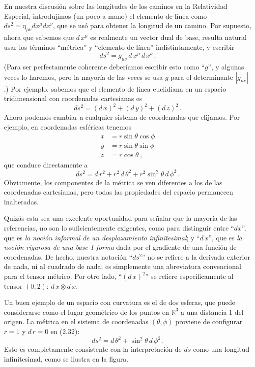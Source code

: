 \documentclass[11pt,b5paper,openany,twoside]{book}
\newcommand{\mn}{{\mu\nu}}
\newcommand{\R}{\mathbb{R}}
\begin{document}
En nuestra discusión sobre las longitudes de los caminos en la Relatividad Especial, introdujimos (un poco a mano) el elemento de línea como $ds^2 = \eta_\mn dx^\mu dx^\nu$, que se usó para obtener la longitud de un camino.
Por supuesto, ahora que sabemos que $ d\,x^\mu$ es realmente un vector dual de base, resulta natural usar los términos ``métrica'' y ``elemento de línea'' indistintamente, y escribir
\begin{equation}
ds^2 = g_\mn \, d\,x^\mu \, d\,x^\nu\,.\label{2.29}
\end{equation}
(Para ser perfectamente coherente deberíamos escribir esto como ``$g$'', y algunas veces lo haremos, pero la mayoría de las veces se usa $g$ para el determinante $|g_\mn|$.)
Por ejemplo, sabemos que el elemento de línea euclidiana en un espacio tridimensional con coordenadas cartesianas es
\begin{equation}
ds^2 = ( d\,x)^2 + ( d\,y)^2 + ( d\,z)^2\,.\label{2.30}
\end{equation}
Ahora podemos cambiar a cualquier sistema de coordenadas que elijamos.
Por ejemplo, en coordenadas esféricas tenemos
\begin{align}
x &=  r\sin\theta \cos\phi\nonumber \\
y &=  r\sin\theta \sin\phi\nonumber \\ z &=  r\cos\theta\ , \label{2.31}
\end{align}
que conduce directamente a
\begin{equation}
ds^2 =  d\,r^2 + r^2 \, d\,\theta^2 + r^2\sin^2\theta\, d\,\phi^2\,.\label{2.32}
\end{equation}
Obviamente, los componentes de la métrica se ven diferentes a los de las coordenadas cartesianas, pero todas las propiedades del espacio permanecen inalteradas.

Quizás esta sea una excelente oportunidad para señalar que la mayoría de las referencias, no son lo suficientemente exigentes, como para distinguir entre ``$dx$'', que es \textit{la noción informal de un desplazamiento infinitesimal}; y ``$d\,x$'', que es \textit{la noción rigurosa de una base 1-forma} dada por el gradiente de una función de coordenadas.
De hecho, nuestra notación ``$ds^2$'' no se refiere a la derivada exterior de nada, ni al cuadrado de nada; es simplemente una abreviatura convencional para el tensor métrico.
Por otro lado, ``$( d\,x)^2$'' se refiere específicamente al tensor $(0,2)$: $ d\,x\otimes d\,x$.

Un buen ejemplo de un espacio con curvatura es el de dos esferas, que puede considerarse como el lugar geométrico de los puntos en $\R^3$ a una distancia 1 del origen.
La métrica en el sistema de coordenadas $(\theta, \phi)$ proviene de configurar $r=1$ y $ d\,r=0$ en (2.32):
\begin{equation}
ds^2 =  d\,\theta^2 + \sin^2\theta\, d\,\phi^2\,.\label{2.33}
\end{equation}
Esto es completamente consistente con la interpretación de $ds$ como una longitud infinitesimal, como se ilustra en la figura.
\end{document}
